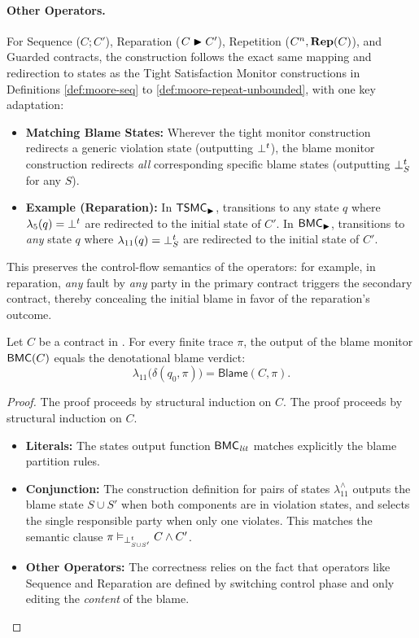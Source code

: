 \begin{definition}
\paragraph{Other Operators.}
For Sequence ($C ; C'$), Reparation ($C \blacktriangleright C'$), Repetition ($C^n, \mathbf{Rep}(C)$), and Guarded contracts, the construction follows the exact same mapping and redirection to states as the Tight Satisfaction Monitor constructions in Definitions \ref{def:moore-seq} to \ref{def:moore-repeat-unbounded}, with one key adaptation:
\begin{itemize}
    \item \textbf{Matching Blame States:} Wherever the tight monitor construction redirects a generic violation state (outputting $\bot^t$), the blame monitor construction redirects \emph{all} corresponding specific blame states (outputting $\mathbin{\bot^{t}_{S}}$ for any $S$).
    \item \textbf{Example (Reparation):} In $\mathsf{TSMC}_{\blacktriangleright}$, transitions to any state $q$ where $\lambda_5(q)=\bot^t$ are redirected to the initial state of $C'$. In $\mathsf{BMC}_{\blacktriangleright}$, transitions to \emph{any} state $q$ where $\lambda_{11}(q)=\mathbin{\bot^{t}_{S}}$ are redirected to the initial state of $C'$.
\end{itemize}
This preserves the control-flow semantics of the operators: for example, in reparation, \emph{any} fault by \emph{any} party in the primary contract triggers the secondary contract, thereby concealing the initial blame in favor of the reparation's outcome.
\end{definition}

\begin{theorem}
\label{thm:bm-correct}
Let $C$ be a contract in \cDL. For every finite trace $\pi$, the output of the blame monitor $\mathsf{BMC}(C)$ equals the denotational blame verdict:
\[
\lambda_{11}\bigl(\delta(q_0,\pi)\bigr) = \mathsf{Blame}(C,\pi).
\]
\end{theorem}

\begin{proof}
The proof proceeds by structural induction on $C$.
The proof proceeds by structural induction on $C$.
\begin{itemize}
\item \textbf{Literals:} The states output function $\mathsf{BMC}_{\mathit{lit}}$ matches explicitly the blame partition rules.
\item \textbf{Conjunction:} The construction definition for pairs of states $\lambda_{11}^{\wedge}$ outputs the blame state  $S \cup S'$ when both components are in violation states, and selects the single responsible party when only one violates. This matches the semantic clause $\pi \vDash_{\mathbin{\bot^{t}_{S \cup S'}}} C \wedge C'$.
\item \textbf{Other Operators:} The correctness relies on the fact that operators like Sequence and Reparation are defined by switching control phase and only editing the \emph{content} of the blame.
\end{itemize}
\end{proof}

